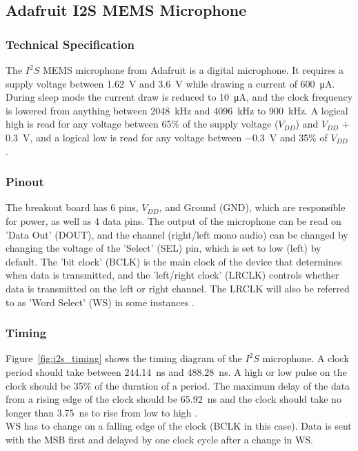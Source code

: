 \subsection{Adafruit I2S MEMS Microphone}

\subsubsection{Technical Specification}

The $I^2S$ MEMS microphone from Adafruit \cite{i2s_mic} is a digital microphone.
It requires a supply voltage between \SI{1.62}{\volt} and \SI{3.6}{\volt} while drawing a current of \SI{600}{\micro\ampere}.
During sleep mode the current draw is reduced to \SI{10}{\micro\ampere}, and the clock frequency is lowered from anything between
\SI{2048}{\kilo\hertz} and \SI{4096}{\kilo\hertz} to \SI{900}{\kilo\hertz}.
A logical high is read for any voltage between 65\% of the supply voltage ($V_{DD}$) and $V_{DD}$ + \SI{0.3}{\volt},
and a logical low is read for any voltage between \SI{-0.3}{\volt} and 35\% of $V_{DD}$ \cite{i2s_mic_datasheet}.

\subsubsection{Pinout}

The breakout board has 6 pins, $V_{DD}$, and Ground (GND), which are responsible for power, as well as 4 data pins.
The output of the microphone can be read on 'Data Out' (DOUT), and the channel (right/left mono audio) can be changed by
changing the voltage of the 'Select' (SEL) pin, which is set to low (left) by default.
The 'bit clock' (BCLK) is the main clock of the device that determines when data is transmitted, and the 'left/right clock' (LRCLK)
controls whether data is transmitted on the left or right channel.
The LRCLK will also be referred to as 'Word Select' (WS) in some instances \cite{i2s_mic_pinout}.

\subsubsection{Timing}

Figure~\ref{fig:i2s_timing} shows the timing diagram of the $I^2S$ microphone.
A clock period should take between \SI{244.14}{\nano\second} and \SI{488.28}{\nano\second}.
A high or low pulse on the clock should be 35\% of the duration of a period.
The maximum delay of the data from a rising edge of the clock should be \SI{65.92}{\nano\second}
and the clock should take no longer than \SI{3.75}{\nano\second} to rise from low to high \cite{i2s_mic_datasheet}.
\\
WS has to change on a falling edge of the clock (BCLK in this case).
Data is sent with the MSB first and delayed by one clock cycle after a change in WS.

